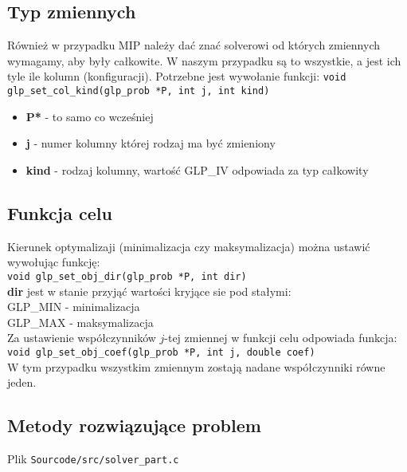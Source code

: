\subsection{Typ zmiennych}\label{typ_zmiennych}
Również w przypadku MIP należy dać znać solverowi od których zmiennych wymagamy, aby były całkowite. W naszym przypadku są to wszystkie, a jest ich tyle ile kolumn (konfiguracji).
Potrzebne jest wywołanie funkcji:
\verb|void glp_set_col_kind(glp_prob *P, int j, int kind)|

\begin{itemize}
	\item \textbf{P*} - to samo co wcześniej
	\item \textbf{j} - numer kolumny której rodzaj ma być zmieniony
	\item \textbf{kind} - rodzaj kolumny, wartość GLP\_IV odpowiada za typ całkowity
\end{itemize}

\subsection{Funkcja celu}
Kierunek optymalizaji (minimalizacja czy maksymalizacja) można ustawić wywołując funkcję: \\
\verb|void glp_set_obj_dir(glp_prob *P, int dir)| \\
\textbf{dir} jest w stanie przyjąć wartości kryjące sie pod stałymi: \\
GLP\_MIN - minimalizacja \\
GLP\_MAX - maksymalizacja \\

Za ustawienie współczynników $j$-tej zmiennej w funkcji celu odpowiada funkcja: \\
\verb|void glp_set_obj_coef(glp_prob *P, int j, double coef)| \\
W tym przypadku wszystkim zmiennym zostają nadane współczynniki równe jeden.

\subsection{Metody rozwiązujące problem}
{\parindent0pt
Plik \verb|Sourcode/src/solver_part.c|
}
